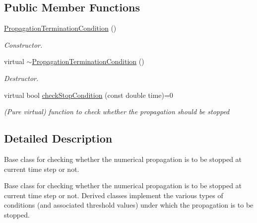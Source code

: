 \subsection*{Public Member Functions}
\begin{DoxyCompactItemize}
\item 
\hyperlink{classtudat_1_1propagators_1_1PropagationTerminationCondition_ab37a13ef67e7a60e7cbd0c40f0f9f520}{Propagation\+Termination\+Condition} ()\hypertarget{classtudat_1_1propagators_1_1PropagationTerminationCondition_ab37a13ef67e7a60e7cbd0c40f0f9f520}{}\label{classtudat_1_1propagators_1_1PropagationTerminationCondition_ab37a13ef67e7a60e7cbd0c40f0f9f520}

\begin{DoxyCompactList}\small\item\em Constructor. \end{DoxyCompactList}\item 
virtual \hyperlink{classtudat_1_1propagators_1_1PropagationTerminationCondition_aa79a5db982d31bff685322320ff0bbf3}{$\sim$\+Propagation\+Termination\+Condition} ()\hypertarget{classtudat_1_1propagators_1_1PropagationTerminationCondition_aa79a5db982d31bff685322320ff0bbf3}{}\label{classtudat_1_1propagators_1_1PropagationTerminationCondition_aa79a5db982d31bff685322320ff0bbf3}

\begin{DoxyCompactList}\small\item\em Destructor. \end{DoxyCompactList}\item 
virtual bool \hyperlink{classtudat_1_1propagators_1_1PropagationTerminationCondition_a2a53592475bbfb408fd12faf21c5f3be}{check\+Stop\+Condition} (const double time)=0
\begin{DoxyCompactList}\small\item\em (Pure virtual) function to check whether the propagation should be stopped \end{DoxyCompactList}\end{DoxyCompactItemize}


\subsection{Detailed Description}
Base class for checking whether the numerical propagation is to be stopped at current time step or not. 

Base class for checking whether the numerical propagation is to be stopped at current time step or not. Derived classes implement the various types of conditions (and associated threshold values) under which the propagation is to be stopped. 

